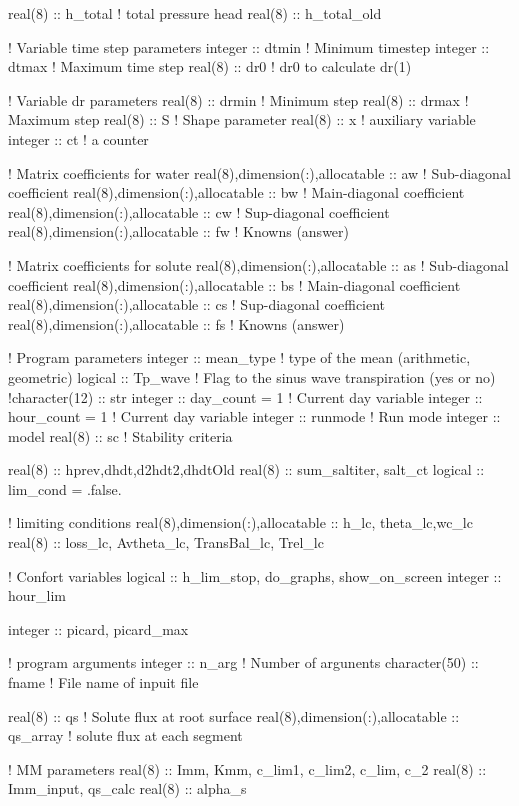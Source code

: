 real(8) :: h_total				! total pressure head
real(8) :: h_total_old

! Variable time step parameters
integer :: dtmin				! Minimum timestep
integer :: dtmax				! Maximum time step
real(8) :: dr0					! dr0 to calculate dr(1)

! Variable dr parameters
real(8) :: drmin				! Minimum step
real(8) :: drmax				! Maximum step
real(8) :: S					! Shape parameter
real(8) :: x					! auxiliary variable
integer :: ct					! a counter

! Matrix coefficients for water
real(8),dimension(:),allocatable :: aw	  	! Sub-diagonal coefficient 
real(8),dimension(:),allocatable :: bw	  	! Main-diagonal coefficient
real(8),dimension(:),allocatable :: cw     	! Sup-diagonal coefficient
real(8),dimension(:),allocatable :: fw     	! Knowns (answer)

! Matrix coefficients for solute
real(8),dimension(:),allocatable :: as		! Sub-diagonal coefficient
real(8),dimension(:),allocatable :: bs		! Main-diagonal coefficient
real(8),dimension(:),allocatable :: cs		! Sup-diagonal coefficient
real(8),dimension(:),allocatable :: fs		! Knowns (answer)

! Program parameters
integer :: mean_type				! type of the mean (arithmetic, geometric)
logical :: Tp_wave				! Flag to the sinus wave transpiration (yes or no)
!character(12) :: str
integer :: day_count = 1			! Current day variable
integer :: hour_count = 1			! Current day variable
integer :: runmode				! Run mode
integer :: model
real(8) :: sc					! Stability criteria

real(8) :: hprev,dhdt,d2hdt2,dhdtOld
real(8) :: sum_saltiter, salt_ct
logical :: lim_cond = .false.

! limiting conditions
real(8),dimension(:),allocatable :: h_lc, theta_lc,wc_lc
real(8) :: loss_lc, Avtheta_lc, TransBal_lc, Trel_lc

! Confort variables
logical :: h_lim_stop, do_graphs, show_on_screen
integer :: hour_lim

integer :: picard, picard_max

! program arguments
integer :: n_arg				! Number of argunents
character(50) :: fname				! File name of inpuit file

real(8) :: qs 					! Solute flux at root surface
real(8),dimension(:),allocatable :: qs_array  	! solute flux at each segment

! MM parameters
real(8) :: Imm, Kmm, c_lim1, c_lim2, c_lim, c_2
real(8) :: Imm_input, qs_calc
real(8) :: alpha_s

